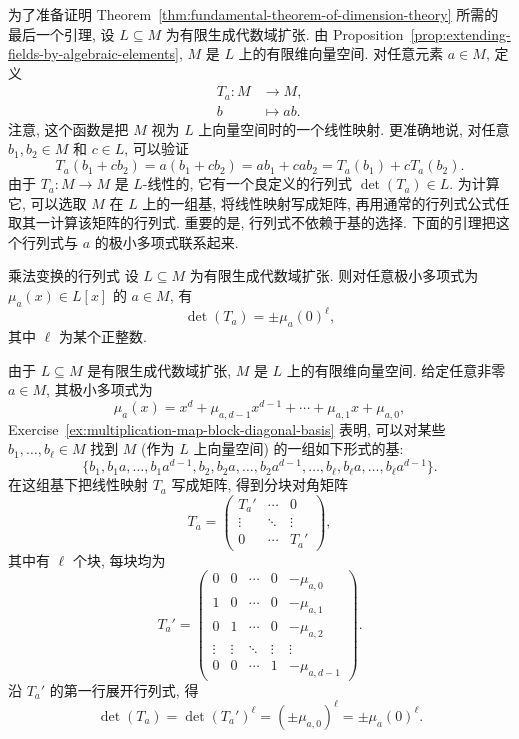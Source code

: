 为了准备证明 Theorem~\ref{thm:fundamental-theorem-of-dimension-theory} 所需的最后一个引理, 设 $L\subseteq M$ 为有限生成代数域扩张. 由 Proposition~\ref{prop:extending-fields-by-algebraic-elements}, $M$ 是 $L$ 上的有限维向量空间. 对任意元素 $a\in M$, 定义
\[
  \begin{aligned}
    T_{a}:M&\to M,\\
    b&\mapsto ab.
  \end{aligned}
\]
注意, 这个函数是把 $M$ 视为 $L$ 上向量空间时的一个线性映射. 更准确地说, 对任意 $b_{1},b_{2}\in M$ 和 $c\in L$, 可以验证
\[
  T_{a}(b_{1}+cb_{2})=a(b_{1}+cb_{2})=ab_{1}+cab_{2}=T_{a}(b_{1})+cT_{a}(b_{2}).
\]
由于 $T_{a}:M\to M$ 是 $L$-线性的, 它有一个良定义的行列式 $\det(T_{a})\in L$. 为计算它, 可以选取 $M$ 在 $L$ 上的一组基, 将线性映射写成矩阵, 再用通常的行列式公式任取其一计算该矩阵的行列式. 重要的是, 行列式不依赖于基的选择. 下面的引理把这个行列式与 $a$ 的极小多项式联系起来.

\begin{Lemma}{乘法变换的行列式}\leavevmode\label{lem:determinant-of-multiplication}
设 $L\subseteq M$ 为有限生成代数域扩张. 则对任意极小多项式为 $\mu_{a}(x)\in L[x]$ 的 $a\in M$, 有
\[
  \det(T_{a})=\pm\mu_{a}(0)^{\ell},
\]
其中 $\ell$ 为某个正整数.
\end{Lemma}
\begin{Proof}
由于 $L\subseteq M$ 是有限生成代数域扩张, $M$ 是 $L$ 上的有限维向量空间. 给定任意非零 $a\in M$, 其极小多项式为
\[
  \mu_{a}(x)=x^{d}+\mu_{a,d-1}x^{d-1}+\cdots+\mu_{a,1}x+\mu_{a,0},
\]
Exercise~\ref{ex:multiplication-map-block-diagonal-basis} 表明, 可以对某些 $b_{1},\ldots,b_{\ell}\in M$ 找到 $M$ (作为 $L$ 上向量空间) 的一组如下形式的基:
\[
  \{b_{1},b_{1}a,\ldots,b_{1}a^{d-1},b_{2},b_{2}a,\ldots,b_{2}a^{d-1},
    \ldots,b_{\ell},b_{\ell}a,\ldots,b_{\ell}a^{d-1}\}.
\]
在这组基下把线性映射 $T_{a}$ 写成矩阵, 得到分块对角矩阵
\[
  T_{a}=\begin{pmatrix}
    T_{a}' & \cdots & 0\\
    \vdots & \ddots & \vdots\\
    0 & \cdots & T_{a}'
  \end{pmatrix},
\]
其中有 $\ell$ 个块, 每块均为
\[
  T_{a}'=\begin{pmatrix}
    0 & 0 & \cdots & 0 & -\mu_{a,0}\\
    1 & 0 & \cdots & 0 & -\mu_{a,1}\\
    0 & 1 & \cdots & 0 & -\mu_{a,2}\\
    \vdots & \vdots & \ddots & \vdots & \vdots\\
    0 & 0 & \cdots & 1 & -\mu_{a,d-1}
  \end{pmatrix}.
\]
沿 $T_{a}'$ 的第一行展开行列式, 得
\[
  \det(T_{a})=\det(T_{a}')^{\ell}=(\pm\mu_{a,0})^{\ell}=\pm\mu_{a}(0)^{\ell}.
\]
\end{Proof}

